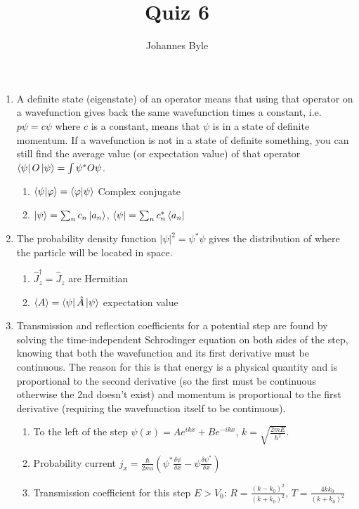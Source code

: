\documentclass[english]{article}
\begin{document}
\author{Johannes Byle}
\title{Quiz 6}
\maketitle
\begin{enumerate}
\item A definite state (eigenstate) of an operator means that using that operator on a wavefunction gives back the same wavefunction times a constant, i.e. $p\psi=c\psi$ where $c$ is a constant, means that $\psi$ is in a state of definite momentum. If a wavefunction is not in a state of definite something, you can still find the
average value (or expectation value) of that operator $\bra{\psi}O\ket{\psi}=\int\psi^{*}O\psi$.
\begin{enumerate}
\item $\bra{\psi}\ket{\varphi}=\bra{\varphi}\ket{\psi}$ Complex conjugate
\item $\ket{\psi}=\sum_n c_n\ket{a_n}$, $\bra{\psi}=\sum_n c_n^{*}\bra{a_n}$
\end{enumerate}
\item The probability density function $|\psi|^2=\psi^*\psi$ gives the distribution of where the particle will be located in space.
\begin{enumerate}
\item $\hat{J}^{\dagger}_z=\hat{J}_z$ are Hermitian
\item $\langle A\rangle =\bra{\psi}\hat{A}\ket{\psi}$ expectation value
\end{enumerate}
\item Transmission and reflection coefficients for a potential step are found by solving the time-independent Schrodinger equation on both sides of the step, knowing that both the wavefunction and its first derivative must be continuous. The reason for this is that energy is a physical quantity and is proportional to the second derivative (so the first must be continuous otherwise the 2nd doesn't exist) and momentum is proportional to the first derivative (requiring the wavefunction itself to be continuous).
\begin{enumerate}
\item To the left of the step $\psi(x)=Ae^{ikx}+Be^{-ikx}$, $k=\sqrt{\frac{2mE}{\hbar^2}}$.
\item Probability current $j_x=\frac{\hbar}{2mi}\left(\psi^*\frac{\delta\psi}{\delta x}-\psi\frac{\delta \psi^*}{\delta x}\right)$
\item Transmission coefficient for this step $E>V_0$: $R=\frac{(k-k_0)^2}{(k+k_0)^2}$, $T=\frac{4kk_0}{(k+k_0)^2}$

\end{enumerate}
\end{enumerate}
\end{document}
